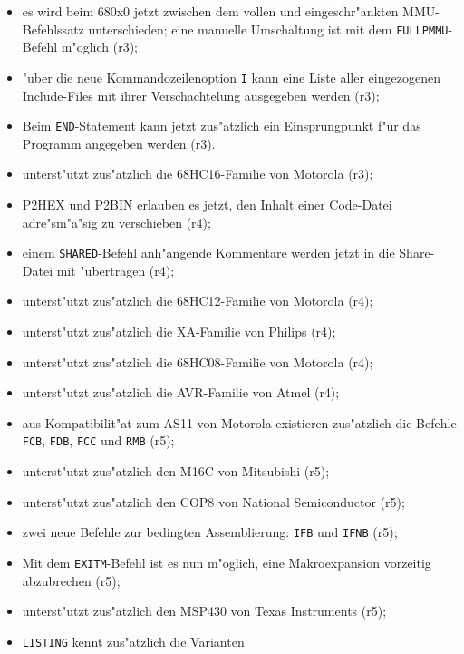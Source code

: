 \documentclass[12pt,a4paper,twoside]{report}
\newcommand{\tty}[1]{{\tt #1}}
\begin{document}
\begin{itemize}
{\begin{itemize}
{            jetzt gew"ahlt werden, ob die Ablage von Konstanten im Big-
            oder Little-Endian-Format erfolgen soll (r3);}
      \item{es wird beim 680x0 jetzt zwischen dem vollen und eingeschr"ankten
            MMU-Befehlssatz unterschieden; eine manuelle Umschaltung ist mit dem
            \tty{FULLPMMU}-Befehl m"oglich (r3);}
      \item{"uber die neue Kommandozeilenoption \tty{I} kann eine Liste
            aller eingezogenen Include-Files mit ihrer Verschachtelung
            ausgegeben werden (r3);}
      \item{Beim \tty{END}-Statement kann jetzt zus"atzlich ein
            Einsprungpunkt f"ur das Programm angegeben werden (r3).}
      \item{unterst"utzt zus"atzlich die 68HC16-Familie von Motorola (r3);}
      \item{P2HEX und P2BIN erlauben es jetzt, den Inhalt einer Code-Datei
            adre"sm"a"sig zu verschieben (r4);}
      \item{einem \tty{SHARED}-Befehl anh"angende Kommentare werden jetzt
            in die Share-Datei mit "ubertragen (r4);}
      \item{unterst"utzt zus"atzlich die 68HC12-Familie von Motorola (r4);}
      \item{unterst"utzt zus"atzlich die XA-Familie von Philips (r4);}
      \item{unterst"utzt zus"atzlich die 68HC08-Familie von Motorola (r4);}
      \item{unterst"utzt zus"atzlich die AVR-Familie von Atmel (r4);}
      \item{aus Kompatibilit"at zum AS11 von Motorola existieren zus"atzlich
            die Befehle \tty{FCB}, \tty{FDB}, \tty{FCC} und \tty{RMB} (r5);}
      \item{unterst"utzt zus"atzlich den M16C von Mitsubishi (r5);}
      \item{unterst"utzt zus"atzlich den COP8 von National Semiconductor
            (r5);}
      \item{zwei neue Befehle zur bedingten Assemblierung: \tty{IFB} und
            \tty{IFNB} (r5);}
      \item{Mit dem \tty{EXITM}-Befehl ist es nun m"oglich, eine
            Makroexpansion vorzeitig abzubrechen (r5);}
      \item{unterst"utzt zus"atzlich den MSP430 von Texas Instruments
            (r5);}
      \item{\tty{LISTING} kennt zus"atzlich die Varianten
}
\end{itemize}}
\end{itemize}
\end{document}
